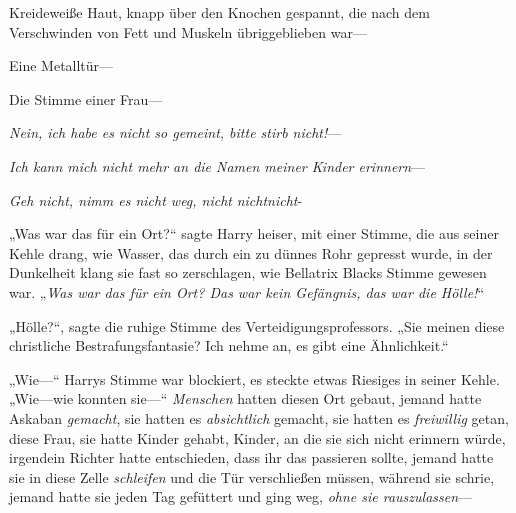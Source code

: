 Kreideweiße Haut, knapp über den Knochen gespannt, die nach dem Verschwinden von Fett und Muskeln übriggeblieben war—

Eine Metalltür—

Die Stimme einer Frau—

\emph{Nein, ich habe es nicht so gemeint, bitte stirb nicht!}—

\emph{Ich kann mich nicht mehr an die Namen meiner Kinder erinnern}—

\emph{Geh nicht, nimm es nicht weg, nicht} \emph{nichtnicht}-

„Was war das für ein Ort?“ sagte Harry heiser, mit einer Stimme, die aus seiner Kehle drang, wie Wasser, das durch ein zu dünnes Rohr gepresst wurde, in der Dunkelheit klang sie fast so zerschlagen, wie Bellatrix Blacks Stimme gewesen war. „\emph{Was war das für ein Ort? Das war kein Gefängnis, das war die Hölle!}“

„Hölle?“, sagte die ruhige Stimme des Verteidigungsprofessors. „Sie meinen diese christliche Bestrafungsfantasie? Ich nehme an, es gibt eine Ähnlichkeit.“

„Wie—“ Harrys Stimme war blockiert, es steckte etwas Riesiges in seiner Kehle. „Wie—wie konnten sie—“ \emph{Menschen} hatten diesen Ort gebaut, jemand hatte Askaban \emph{gemacht}, sie hatten es \emph{absichtlich} gemacht, sie hatten es \emph{freiwillig} getan, diese Frau, sie hatte Kinder gehabt, Kinder, an die sie sich nicht erinnern würde, irgendein Richter hatte entschieden, dass ihr das passieren sollte, jemand hatte sie in diese Zelle \emph{schleifen} und die Tür verschließen müssen, während sie schrie, jemand hatte sie jeden Tag gefüttert und ging weg, \emph{ohne sie rauszulassen}—

